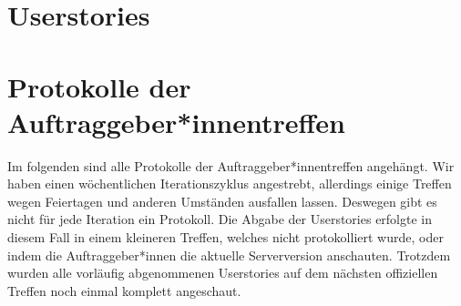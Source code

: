 \documentclass[accentcolor=tud0b,12pt,paper=a4]{tudreport}
\begin{document}
	
	
	
	
	
	
	
	
	
	
	
		

\chapter{Userstories}
	


\chapter{Protokolle der Auftraggeber*innentreffen}

	Im folgenden sind alle Protokolle der Auftraggeber*innentreffen angehängt. Wir haben einen wöchentlichen Iterationszyklus angestrebt, allerdings einige Treffen wegen Feiertagen und anderen Umständen ausfallen lassen. Deswegen gibt es nicht für jede Iteration ein Protokoll. Die Abgabe der Userstories erfolgte in diesem Fall in einem kleineren Treffen, welches nicht protokolliert wurde, oder indem die Auftraggeber*innen die aktuelle Serverversion anschauten. Trotzdem wurden alle vorläufig abgenommenen Userstories auf dem nächsten offiziellen Treffen noch einmal komplett angeschaut.

	
	
	
	
	
	
	
	
	
	
	
	
	
	
	
\end{document}
